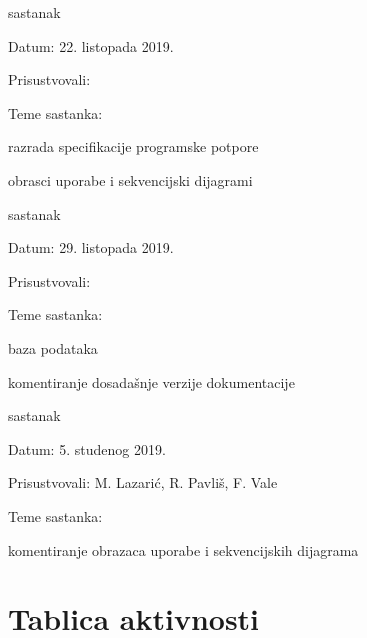 \begin{packed_enum}
			\item  sastanak
			\item[] \begin{packed_item}
				\item Datum: 22. listopada 2019.
				\item Prisustvovali: \imenaSvihClanova
				\item Teme sastanka:
				\begin{packed_item}
					\item razrada specifikacije programske potpore
					\item obrasci uporabe i sekvencijski dijagrami
				\end{packed_item}
			\end{packed_item}
		
			\item  sastanak
			\item[] \begin{packed_item}
				\item Datum: 29. listopada 2019.
				\item Prisustvovali: \imenaSvihClanova
				\item Teme sastanka:
				\begin{packed_item}
					\item baza podataka
					\item komentiranje dosadašnje verzije dokumentacije
				\end{packed_item}
			\end{packed_item}
		
			\item  sastanak
			\item[] \begin{packed_item}
				\item Datum: 5. studenog 2019.
				\item Prisustvovali: M. Lazarić, R. Pavliš, F. Vale
				\item Teme sastanka:
				\begin{packed_item}
					\item komentiranje obrazaca uporabe i sekvencijskih dijagrama
				\end{packed_item}
			\end{packed_item}
			
			
		\end{packed_enum}
		
		\eject
		\section*{Tablica aktivnosti}
		
